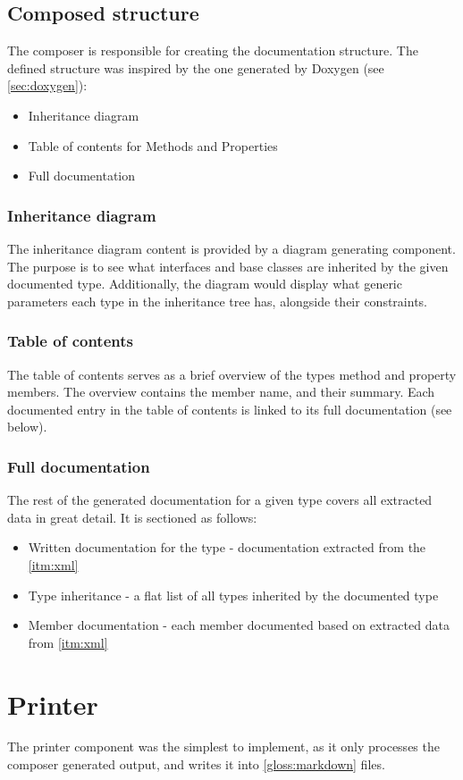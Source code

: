 \subsection{Composed structure}

The composer is responsible for creating the documentation structure. The defined structure was inspired by the one generated by Doxygen (see \ref{sec:doxygen}):
\begin{itemize}
    \item Inheritance diagram
    \item Table of contents for Methods and Properties
    \item Full documentation
\end{itemize}

\subsubsection{Inheritance diagram}

The inheritance diagram content is provided by a diagram generating component. The purpose is to see what interfaces and base classes are inherited by the given documented type. Additionally, the diagram would display what generic parameters each type in the inheritance tree has, alongside their constraints.

\subsubsection{Table of contents}

The table of contents serves as a brief overview of the types method and property members. The overview contains the member name, and their summary. Each documented entry in the table of contents is linked to its full documentation (see below).

\subsubsection{Full documentation}

The rest of the generated documentation for a given type covers all extracted data in great detail. It is sectioned as follows:
\begin{itemize}
    \item Written documentation for the type - documentation extracted from the \ref{itm:xml}
    \item Type inheritance - a flat list of all types inherited by the documented type
    \item Member documentation - each member documented based on extracted data from \ref{itm:xml}
\end{itemize}

\section{Printer}

The printer component was the simplest to implement, as it only processes the composer generated output, and writes it into \ref{gloss:markdown} files.
